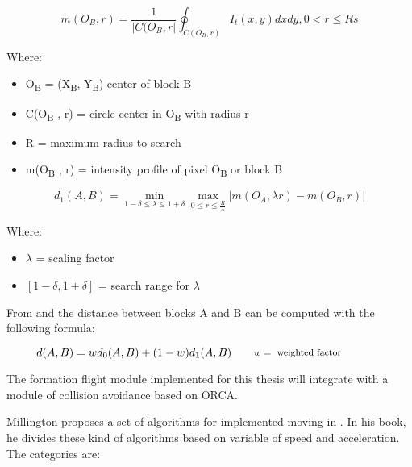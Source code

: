 \begin{equation}
m(O_{B}, r) = \frac{1}{ | C(O_{B}, r |}\oint_{C(O_{B}, r)}I_{t}(x, y)dxdy, 0 < r \leq R
  \label{eqn:intensity-profile-pixel}s
\end{equation}

Where: 
\begin {itemize}
  \item {O}\textsubscript{B} = (X\textsubscript{B}, Y\textsubscript{B}) center of block B
  \item C(O\textsubscript{B} , r) = circle center in O\textsubscript{B}  with radius r
  \item R = maximum radius to search
  \item m(O\textsubscript{B} , r) = intensity profile of pixel O\textsubscript{B}  or block B
\end {itemize}

 
\begin{equation}
d_{1}(A, B) = \min_{1 - \delta \leq  \lambda \leq 1 + \delta} \max_{0 \leq r \leq \frac{R}{\lambda}} | m(O_{A}, \lambda r) - m(O_{B}, r) |
\label{eqn:distance-block}
\end{equation}

Where: 
\begin {itemize}
  \item $\lambda$ = scaling factor
  \item $[1 - \delta, 1 + \delta]$  = search range for $\lambda$
\end {itemize}

From  and 
 the distance between blocks A and B
can be computed with the following formula:

\begin{equation}
d(A, B) = w d_{0}(A, B) + (1 - w) d_{1}(A, B)
\qquad\parbox{4.0cm}{\footnotesize$\begin{aligned} 
  w &= \text{ weighted factor }
  \end{aligned}$}
\label{eqn: distance-block}
\end{equation}

The formation flight module implemented for this thesis will integrate with 
a module of collision avoidance based on ORCA.

Millington proposes a set of algorithms for implemented moving in \cite{ai-games}.
In his book, he divides these kind of algorithms based on variable of speed and
acceleration. The categories are:

